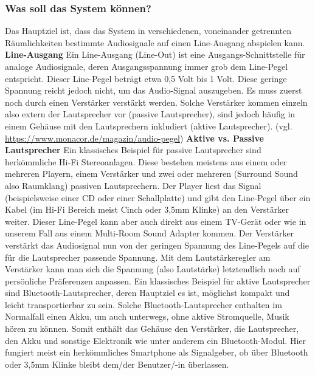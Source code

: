 \documentclass[]{article}
\begin{document}
\subsubsection{Was soll das System können?}
Das Hauptziel ist, dass das System in verschiedenen, voneinander getrennten Räumlichkeiten bestimmte Audiosignale auf einen Line-Ausgang abspielen kann.
\vspace{4mm}\newline
\textbf{Line-Ausgang}\newline
Ein Line-Ausgang (Line-Out) ist eine Ausgangs-Schnittstelle für analoge Audiosignale, deren Ausgangsspannung immer grob dem Line-Pegel entspricht. Dieser \glqq Line-Pegel beträgt etwa 0,5 Volt bis 1 Volt\grqq{}. \newline
Diese geringe Spannung reicht jedoch nicht, um das Audio-Signal auszugeben. Es muss zuerst noch durch einen Verstärker verstärkt werden. Solche Verstärker kommen einzeln also extern der Lautsprecher vor (passive Lautsprecher), sind jedoch häufig in einem Gehäuse mit den Lautsprechern inkludiert (aktive Lautsprecher).
\vspace{4mm}\newline
(vgl. \url{https://www.monacor.de/magazin/audio-pegel})
\vspace{4mm}\newline
\textbf{Aktive vs. Passive Lautsprecher}\newline
Ein klassisches Beispiel für passive Lautsprecher sind herkömmliche Hi-Fi Stereoanlagen. Diese bestehen meistens aus einem oder mehreren Playern, einem Verstärker und zwei oder mehreren (Surround Sound also Raumklang) passiven Lautsprechern. Der Player liest das Signal (beispielsweise einer CD oder einer Schallplatte) und gibt den Line-Pegel über ein Kabel (im Hi-Fi Bereich meist Cinch oder 3,5mm Klinke) an den Verstärker weiter. Dieser Line-Pegel kann aber auch direkt aus einem TV-Gerät oder wie in unserem Fall aus einem Multi-Room Sound Adapter kommen. Der Verstärker verstärkt das Audiosignal nun von der geringen Spannung des Line-Pegels auf die für die Lautsprecher passende Spannung. Mit dem Lautstärkeregler am Verstärker kann man sich die Spannung (also Lautstärke) letztendlich noch auf persönliche Präferenzen anpassen. \newline
Ein klassisches Beispiel für aktive Lautsprecher sind Bluetooth-Lautsprecher, deren Hauptziel es ist, möglichst kompakt und leicht transportierbar zu sein. Solche Bluetooth-Lautsprecher enthalten im Normalfall einen Akku, um auch unterwegs, ohne aktive Stromquelle, Musik hören zu können. Somit enthält das Gehäuse den Verstärker, die Lautsprecher, den Akku und sonstige Elektronik wie unter anderem ein Bluetooth-Modul. Hier fungiert meist ein herkömmliches Smartphone als Signalgeber, ob über Bluetooth oder 3,5mm Klinke bleibt dem/der Benutzer/-in überlassen.\newline
\end{document}
